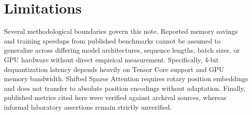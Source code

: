 \documentclass[11pt,a4paper]{article}
\begin{document}
\section{Limitations}

Several methodological boundaries govern this note. Reported memory savings and training speedups from published benchmarks cannot be assumed to generalize across differing model architectures, sequence lengths, batch sizes, or GPU hardware without direct empirical measurement. Specifically, 4-bit dequantization latency depends heavily on Tensor Core support and GPU memory bandwidth. Shifted Sparse Attention requires rotary position embeddings and does not transfer to absolute position encodings without adaptation. Finally, published metrics cited here were verified against archival sources, whereas informal laboratory assertions remain strictly unverified.



\end{document}
